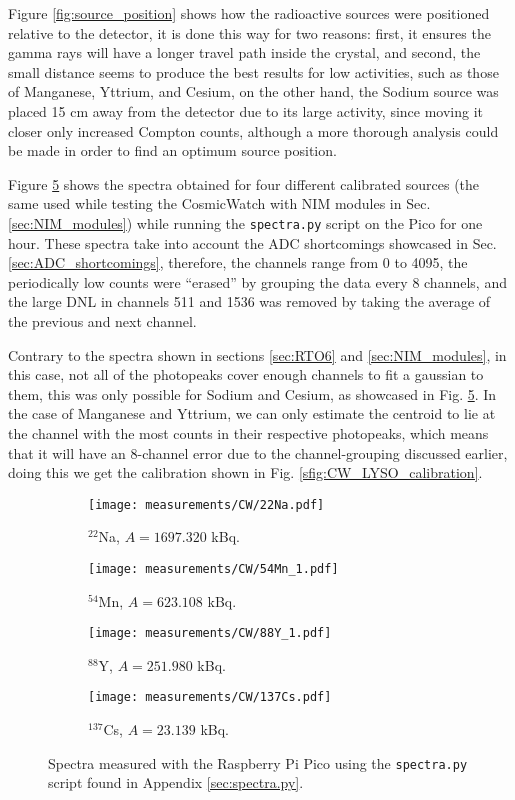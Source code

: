 Figure \ref{fig:source_position} shows how the radioactive sources were positioned relative to the detector, it is done this way for two reasons: first, it ensures the gamma rays will have a longer travel path inside the crystal, and second, the small distance seems to produce the best results for low activities, such as those of Manganese, Yttrium, and Cesium, on the other hand, the Sodium source was placed 15 \unit{\cm} away from the detector due to its large activity, since moving it closer only increased Compton counts, although a more thorough analysis could be made in order to find an optimum source position.

Figure \ref{fig:CW_spectra} shows the spectra obtained for four different calibrated sources (the same used while testing the CosmicWatch with NIM modules in Sec. \ref{sec:NIM_modules}) while running the \texttt{spectra.py} script on the Pico for one hour. These spectra take into account the ADC shortcomings showcased in Sec. \ref{sec:ADC_shortcomings}, therefore, the channels range from 0 to 4095, the periodically low counts were ``erased'' by grouping the data every 8 channels, and the large DNL in channels 511 and 1536 was removed by taking the average of the previous and next channel. 

Contrary to the spectra shown in sections \ref{sec:RTO6} and \ref{sec:NIM_modules}, in this case, not all of the photopeaks cover enough channels to fit a gaussian to them, this was only possible for Sodium and Cesium, as showcased in Fig. \ref{fig:CW_spectra}. In the case of Manganese and Yttrium, we can only estimate the centroid to lie at the channel with the most counts in their respective photopeaks, which means that it will have an 8-channel error due to the channel-grouping discussed earlier, doing this we get the calibration shown in Fig. \ref{sfig:CW_LYSO_calibration}.

\begin{figure}[H]
  \begin{subfigure}[t]{0.48\textwidth}
    \centering
    \texttt{[image: measurements/CW/22Na.pdf]}
    \caption{\label{sfig:CW_22Na}$^{22}$Na, $A=1697.320$ kBq.}
  \end{subfigure}
  \hfill
  \begin{subfigure}[t]{0.48\textwidth}
    \centering
    \texttt{[image: measurements/CW/54Mn\_1.pdf]}
    \caption{\label{sfig:C2_54Mn}$^{54}$Mn, $A=623.108$ kBq.}
  \end{subfigure}
  \medskip
  \begin{subfigure}[t]{0.48\textwidth}
    \centering
    \texttt{[image: measurements/CW/88Y\_1.pdf]}
    \caption{\label{sfig:CW_88Y}$^{88}$Y, $A=251.980$ kBq.}
  \end{subfigure}
  \hfill
  \begin{subfigure}[t]{0.48\textwidth}
    \centering
    \texttt{[image: measurements/CW/137Cs.pdf]}
    \caption{\label{sfig:CW_137Cs}$^{137}$Cs, $A=23.139$ kBq.}
  \end{subfigure}
  \caption{\label{fig:CW_spectra}Spectra measured with the Raspberry Pi Pico using the \texttt{spectra.py} script found in Appendix \ref{sec:spectra.py}.}
\end{figure}

